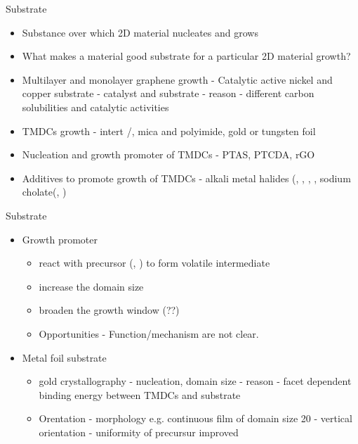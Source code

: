 \documentclass{beamer}
\begin{document}
\begin{frame}{Substrate}
    \begin{itemize}
        \item Substance over which 2D material nucleates and grows
        \item What makes a material good substrate for a particular 2D material growth?
        \item Multilayer and monolayer graphene growth - Catalytic active nickel and copper substrate - catalyst and substrate - reason - different carbon solubilities and catalytic activities
        \item TMDCs growth - intert /, mica and polyimide, gold or tungsten foil
        \item Nucleation and growth promoter of TMDCs - PTAS, PTCDA, rGO
        \item Additives to promote growth of TMDCs - alkali metal halides (, , , , sodium cholate(, )
    \end{itemize}
\end{frame}

\begin{frame}{Substrate}
    \begin{itemize}
        \item Growth promoter
        \begin{itemize}
            \item react with precursor (, ) to form volatile intermediate
            \item increase the domain size
            \item broaden the growth window (??)
            \item Opportunities - Function/mechanism are not clear.
        \end{itemize}
        \item Metal foil substrate
        \begin{itemize}
            \item gold crystallography - nucleation, domain size - reason - facet dependent binding energy between TMDCs and substrate
            \item Orentation - morphology e.g.  continuous film of domain size \unit{20}{\micro\meter} - vertical orientation - uniformity of precursur improved
        \end{itemize}
    \end{itemize}
\end{frame}
\end{document}
